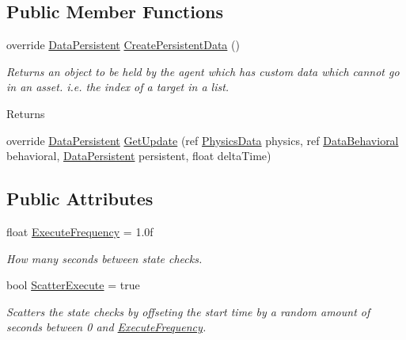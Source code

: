 \subsection*{Public Member Functions}
\begin{DoxyCompactItemize}
\item 
\hypertarget{class_skyrates_1_1_a_i_1_1_behavior_timed_a0da5c761dc335150064632ddd0319d8f}{override \hyperlink{class_skyrates_1_1_a_i_1_1_behavior_1_1_data_persistent}{Data\-Persistent} \hyperlink{class_skyrates_1_1_a_i_1_1_behavior_timed_a0da5c761dc335150064632ddd0319d8f}{Create\-Persistent\-Data} ()}\label{class_skyrates_1_1_a_i_1_1_behavior_timed_a0da5c761dc335150064632ddd0319d8f}

\begin{DoxyCompactList}\small\item\em Returns an object to be held by the agent which has custom data which cannot go in an asset. i.\-e. the index of a target in a list. 

\begin{DoxyReturn}{Returns}

\end{DoxyReturn}
 \end{DoxyCompactList}\item 
override \hyperlink{class_skyrates_1_1_a_i_1_1_behavior_1_1_data_persistent}{Data\-Persistent} \hyperlink{class_skyrates_1_1_a_i_1_1_behavior_timed_a389d21f94b5bbc63e94e4644e4a4129a}{Get\-Update} (ref \hyperlink{class_skyrates_1_1_physics_1_1_physics_data}{Physics\-Data} physics, ref \hyperlink{class_skyrates_1_1_a_i_1_1_behavior_1_1_data_behavioral}{Data\-Behavioral} behavioral, \hyperlink{class_skyrates_1_1_a_i_1_1_behavior_1_1_data_persistent}{Data\-Persistent} persistent, float delta\-Time)
\end{DoxyCompactItemize}
\subsection*{Public Attributes}
\begin{DoxyCompactItemize}
\item 
float \hyperlink{class_skyrates_1_1_a_i_1_1_behavior_timed_a68b9680f03a6c11ad2b6a52550f20d46}{Execute\-Frequency} = 1.\-0f
\begin{DoxyCompactList}\small\item\em How many seconds between state checks. \end{DoxyCompactList}\item 
bool \hyperlink{class_skyrates_1_1_a_i_1_1_behavior_timed_aba11486da69109caed73d703d54e0767}{Scatter\-Execute} = true
\begin{DoxyCompactList}\small\item\em Scatters the state checks by offseting the start time by a random amount of seconds between 0 and \hyperlink{class_skyrates_1_1_a_i_1_1_behavior_timed_a68b9680f03a6c11ad2b6a52550f20d46}{Execute\-Frequency}. \end{DoxyCompactList}\end{DoxyCompactItemize}
